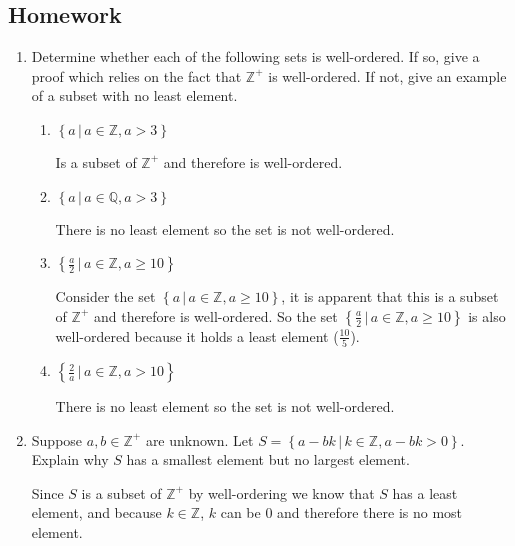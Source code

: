 \documentclass[class=article, crop=false]{standalone}
\def\integers{{\mathbb Z}}
\def\rationals{{\mathbb Q}}
\begin{document}
\subsection{Homework}
\begin{enumerate}

	\item
	  Determine whether each of the following sets is well-ordered.  If
	  so, give a proof which relies on the fact that $\integers^+$ is well-ordered.
	  If not, give an example of a subset with no least element.
	  \begin{enumerate}
	  \item
		$\left\{a\,\big|\, a\in\integers,a>3\right\}$
	
		Is a subset of $\integers^+$ and therefore is well-ordered.
	  \item
		$\left\{a\,\big|\, a\in\rationals,a>3\right\}$
	
		There is no least element so the set is not well-ordered.
	  \item
		$\left\{\frac a2\,\big|\, a\in\integers,a\geq 10\right\}$
	
		Consider the set $\left\{a\,\big|\, a\in\integers,a\geq 10\right\}$, it is apparent that this is a subset of $\integers^+$ and therefore is well-ordered.
		So the set $\left\{\frac a2\,\big|\, a\in\integers,a\geq 10\right\}$ is also well-ordered because it holds a least element ($\frac{10}{5}$).
	  \item
		$\left\{\frac 2a\,\big|\, a\in\integers,a>10\right\}$
	
		There is no least element so the set is not well-ordered.
	  \end{enumerate}
	
	\item
	  Suppose $a,b\in\integers^+$ are unknown.  Let
	  $S=\left\{a-bk\,\big|\, k\in\integers,a-bk>0\right\}$.
	  Explain why $S$ has a smallest element but no largest element.
	
	  Since $S$ is a subset of $\integers^+$ by well-ordering we know that $S$ has a least element, and because $k\in\integers$,
	  $k$ can be $0$ and therefore there is no most element.
	

\end{enumerate}
\end{document}
